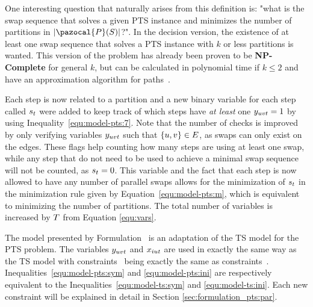 \documentclass[msc,english,table,xcdraw]{ppgccufmg}
\begin{document}
One interesting question that naturally arises from this definition is: "what 
is the swap sequence that solves a given PTS instance and minimizes the number 
of partitions in $\sizeof{\applyFunc{\pazocal{\swapPSeq}}{\swapSeq}}$?".
In the decision version, the existence of at least one swap sequence that solves 
a PTS instance with $k$ or less partitions is wanted.
This version of the problem has already been proven to be \textbf{NP-Complete}
for general $k$, but can be calculated in polynomial time if $k \leq 2$ and
have an approximation algorithm for paths~\citep{Kawahara:2017}.

Each step is now related to a partition and a new binary variable for each step 
called $s_{t}$ were added to keep track of which steps have \textit{at least} 
one $y_{uvt} = 1$ by using Inequality~\ref{equ:model-pts:7}.
Note that the number of checks is improved by only verifying variables $y_{uvt}$
such that $\{u,v\} \in E$, as swaps can only exist on the 
edges.
These flags help counting how many steps are using at least one swap, while any 
step that do not need to be used to achieve a minimal swap sequence will not be 
counted, as $s_{t} = 0$.
This variable and the fact that each step is now allowed to have any number of
parallel swaps allows for the minimization of $s_{t}$ in the minimization 
rule given by Equation~\ref{equ:model-pts:m}, which is equivalent to minimizing 
the number of partitions.
The total number of variables is increased by $T$ from Equation
\ref{equ:vars}.


The model presented by Formulation~ 
is an adaptation of the TS model for the PTS problem. 
The variables $y_{uvt}$ and $x_{iut}$ are used in exactly the same way as the 
TS model with constraints~ being 
exactly the same as constraints~.
Inequalities~\ref{equ:model-pts:sym} and \ref{equ:model-pts:ini} are respectively 
equivalent to the Inequalities~\ref{equ:model-ts:sym} and \ref{equ:model-ts:ini}.
Each new constraint will be explained in detail in Section \ref{sec:formulation_pts:par}.

\end{document}
